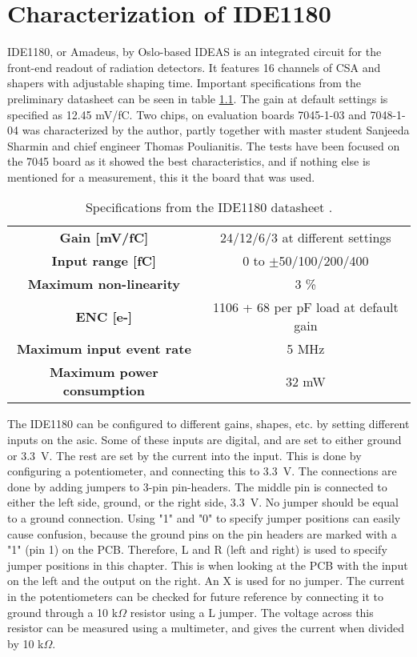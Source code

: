 \documentclass[../main/thesis.tex]{subfiles}
\begin{document}
\newpage

\chapter{Characterization of IDE1180}
\label{ide}

IDE1180, or Amadeus, by Oslo-based IDEAS is an integrated circuit for the front-end readout of radiation detectors. It features 16 channels of \gls{CSA} and shapers with adjustable shaping time. Important specifications from the preliminary datasheet can be seen in table \ref{tab-ide-specs}. The gain at default settings is specified as 12.45 mV/fC. Two chips, on evaluation boards 7045-1-03 and 7048-1-04 was characterized by the author, partly together with master student Sanjeeda Sharmin and chief engineer Thomas Poulianitis. The tests have been focused on the 7045 board as it showed the best characteristics, and if nothing else is mentioned for a measurement, this it the board that was used. 

\begin{table}[h!]
	\begin{center}
		\caption{Specifications from the IDE1180 datasheet \citep{IDE1180}.}
		\label{tab-ide-specs}
		\begin{tabular}{cc}\toprule
			\textbf{Gain [mV/fC]} & 24/12/6/3 at different settings  \\ 
			\textbf{Input range [fC]}     & 0 to $\pm$50/100/200/400  \\
			\textbf{Maximum non-linearity}	&	3 \%	\\
			\textbf{\gls{ENC} [e-]}		& 	1106 + 68 per pF load at default gain \\
			\textbf{Maximum input event rate}	&	5 MHz	\\
			\textbf{Maximum power consumption}	&	32 mW	\\
			 \bottomrule
		\end{tabular}
	\end{center}
\end{table}

The IDE1180 can be configured to different gains, shapes, etc. by setting different inputs on the \gls{asic}. Some of these inputs are digital, and are set to either ground or 3.3~V. The rest are set by the current into the input. This is done by configuring a potentiometer, and connecting this to 3.3~V. The connections are done by adding jumpers to 3-pin pin-headers. The middle pin is connected to either the left side, ground, or the right side, 3.3~V. No jumper should be equal to a ground connection. Using "1" and "0" to specify jumper positions can easily cause confusion, because the ground pins on the pin headers are marked with a "1" (pin 1) on the \gls{PCB}. Therefore, L and R (left and right) is used to specify jumper positions in this chapter. This is when looking at the \gls{PCB} with the input on the left and the output on the right. An X is used for no jumper. The current in the potentiometers can be checked for future reference by connecting it to ground through a 10 k$\Omega$ resistor using a L jumper. The voltage across this resistor can be measured using a multimeter, and gives the current when divided by 10 k$\Omega$. 
\end{document}

